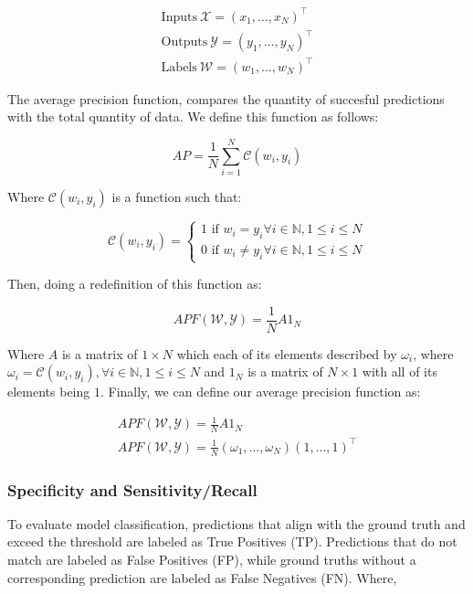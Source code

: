 \documentclass{article}
\begin{document}
\begin{gather}
  \text{Inputs} \ \mathcal{X} = (x_1, \ldots, x_N)^\intercal \\
  \text{Outputs} \ \mathcal{Y} = (y_1, \ldots, y_N)^\intercal \\
  \text{Labels} \ \mathcal{W} = (w_1, \ldots, w_N)^\intercal 
\end{gather}

The average precision function, compares the quantity of succesful predictions with the total quantity of data. We define this function as follows:

\begin{equation*}
AP = \frac{1}{N} \sum_{i=1}^{N}{\mathcal{C}(w_i,y_i)}
\end{equation*}

Where $\mathcal{C}(w_i,y_i)$ is a function such that:

\[
\mathcal{C}(w_i,y_i) =
\begin{cases}
  1 \text{ if } w_i = y_i \forall i \in \mathds{N}, 1 \leq i \leq N\\
  0 \text{ if } w_i \neq y_i \forall i \in \mathds{N}, 1 \leq i \leq N
\end{cases}
\]

Then, doing a redefinition of this function as:

\begin{equation*}
APF(\mathcal{W}, \mathcal{Y}) = \frac{1}{N} A 1_N
\end{equation*}

Where $A$ is a matrix of $1 \times N$ which each of its elements described by $\omega_i$, where $ \omega_i = \mathcal{C}(w_i,y_i), \forall i \in \mathds{N}, 1 \leq i \leq N$ and $1_N$ is a matrix of $N \times 1$ with all of its elements being $1$. Finally, we can define our average precision function as:

\begin{gather}
  APF(\mathcal{W}, \mathcal{Y}) = \frac{1}{N} A 1_N \\
  APF(\mathcal{W}, \mathcal{Y}) = \frac{1}{N} (\omega_1, \ldots, \omega_N) (1, \ldots, 1)^\intercal 
\end{gather}

\subsubsection{Specificity and Sensitivity/Recall}


To evaluate model classification, predictions that align with the ground truth and exceed the threshold are labeled as True Positives (TP). Predictions that do not match are labeled as False Positives (FP), while ground truths without a corresponding prediction are labeled as False Negatives (FN). Where,
\end{document}
